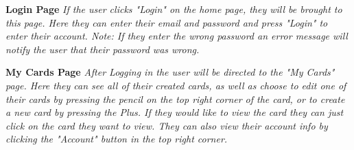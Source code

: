 \documentclass[12pt]{article}%
\begin{document}
\begin{center}
	\clearpage
	{\bf \Large Login Page}
	{\it If the user clicks "Login" on the home page, they will be brought to this page. Here they can enter their email and password 
	and press "Login" to enter their account. Note: If they enter the wrong password an error message will notify the user that their 
	password was wrong.}
	
		\clearpage
	{\bf \Large My Cards Page}
	{\it After Logging in the user will be directed to the "My Cards" page. Here they can see all of their created cards, as well as choose to 
	edit one of their cards by pressing the pencil on the top right corner of the card, or to create a new card by pressing the Plus. If they would 
	like to view the card they can just click on the card they want to view. They can also view their account info by clicking the "Account" button
	in the top right corner.}
	

\end{center}
\end{document}

